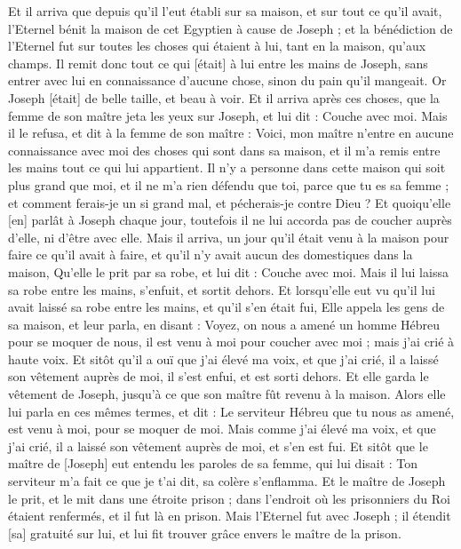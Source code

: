 \begin{multicols}{2}
Et il arriva que depuis qu'il l'eut établi sur sa maison, et sur tout ce qu'il avait, l'Eternel bénit la maison de cet Egyptien à cause de Joseph ; et la bénédiction de l'Eternel fut sur toutes les choses qui étaient à lui, tant en la maison, qu'aux champs.
Il remit donc tout ce qui [était] à lui entre les mains de Joseph, sans entrer avec lui en connaissance d'aucune chose, sinon du pain qu'il mangeait. Or Joseph [était] de belle taille, et beau à voir.
Et il arriva après ces choses, que la femme de son maître jeta les yeux sur Joseph, et lui dit : Couche avec moi.
Mais il le refusa, et dit à la femme de son maître : Voici, mon maître n'entre en aucune connaissance avec moi des choses qui sont dans sa maison, et il m'a remis entre les mains tout ce qui lui appartient.
Il n'y a personne dans cette maison qui soit plus grand que moi, et il ne m'a rien défendu que toi, parce que tu es sa femme ; et comment ferais-je un si grand mal, et pécherais-je contre Dieu ?
Et quoiqu'elle [en] parlât à Joseph chaque jour, toutefois il ne lui accorda pas de coucher auprès d'elle, ni d'être avec elle.
Mais il arriva, un jour qu'il était venu à la maison pour faire ce qu'il avait à faire, et qu'il n'y avait aucun des domestiques dans la maison,
Qu'elle le prit par sa robe, et lui dit : Couche avec moi. Mais il lui laissa sa robe entre les mains, s'enfuit, et sortit dehors.
Et lorsqu'elle eut vu qu'il lui avait laissé sa robe entre les mains, et qu'il s'en était fui,
Elle appela les gens de sa maison, et leur parla, en disant : Voyez, on nous a amené un homme Hébreu pour se moquer de nous, il est venu à moi pour coucher avec moi ; mais j'ai crié à haute voix.
Et sitôt qu'il a ouï que j'ai élevé ma voix, et que j'ai crié, il a laissé son vêtement auprès de moi, il s'est enfui, et est sorti dehors.
Et elle garda le vêtement de Joseph, jusqu'à ce que son maître fût revenu à la maison.
Alors elle lui parla en ces mêmes termes, et dit : Le serviteur Hébreu que tu nous as amené, est venu à moi, pour se moquer de moi.
Mais comme j'ai élevé ma voix, et que j'ai crié, il a laissé son vêtement auprès de moi, et s'en est fui.
Et sitôt que le maître de [Joseph] eut entendu les paroles de sa femme, qui lui disait : Ton serviteur m'a fait ce que je t'ai dit, sa colère s'enflamma.
Et le maître de Joseph le prit, et le mit dans une étroite prison ; dans l'endroit où les prisonniers du Roi étaient renfermés, et il fut là en prison.
Mais l'Eternel fut avec Joseph ; il étendit [sa] gratuité sur lui, et lui fit trouver grâce envers le maître de la prison.

\end{multicols}
